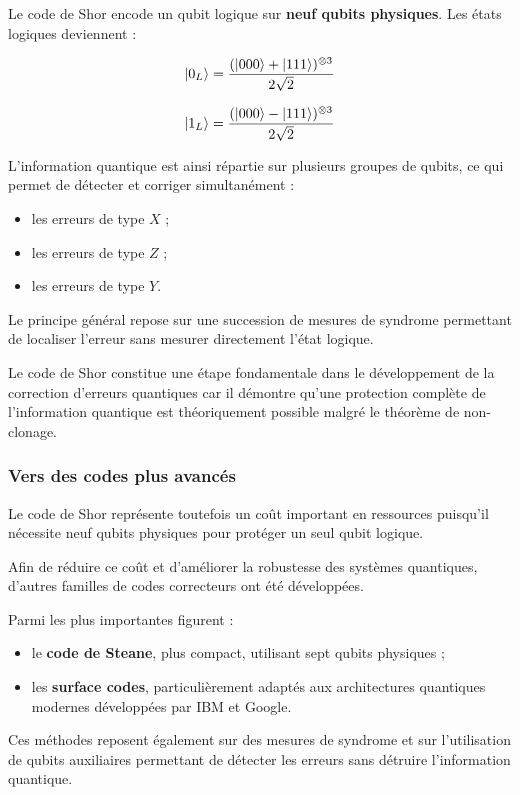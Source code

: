 \documentclass[a4paper,12pt]{article}
\begin{document}
Le code de Shor encode un qubit logique sur \textbf{neuf qubits physiques}. Les états logiques deviennent :

\[
\ket{0_L}
=
\frac{
(\ket{000}+\ket{111})
^{\otimes 3}
}
{2\sqrt{2}}
\]

\[
\ket{1_L}
=
\frac{
(\ket{000}-\ket{111})
^{\otimes 3}
}
{2\sqrt{2}}
\]

L’information quantique est ainsi répartie sur plusieurs groupes de qubits, ce qui permet de détecter et corriger simultanément :

\begin{itemize}
    \item les erreurs de type $X$ ;
    \item les erreurs de type $Z$ ;
    \item les erreurs de type $Y$.
\end{itemize}

Le principe général repose sur une succession de mesures de syndrome permettant de localiser l’erreur sans mesurer directement l’état logique.

Le code de Shor constitue une étape fondamentale dans le développement de la correction d’erreurs quantiques car il démontre qu’une protection complète de l’information quantique est théoriquement possible malgré le théorème de non-clonage.

\subsubsection{Vers des codes plus avancés}

Le code de Shor représente toutefois un coût important en ressources puisqu’il nécessite neuf qubits physiques pour protéger un seul qubit logique.

Afin de réduire ce coût et d’améliorer la robustesse des systèmes quantiques, d’autres familles de codes correcteurs ont été développées.

Parmi les plus importantes figurent :

\begin{itemize}
    \item le \textbf{code de Steane}, plus compact, utilisant sept qubits physiques ;
    \item les \textbf{surface codes}, particulièrement adaptés aux architectures quantiques modernes développées par IBM et Google.
\end{itemize}

Ces méthodes reposent également sur des mesures de syndrome et sur l’utilisation de qubits auxiliaires permettant de détecter les erreurs sans détruire l’information quantique.
\end{document}
